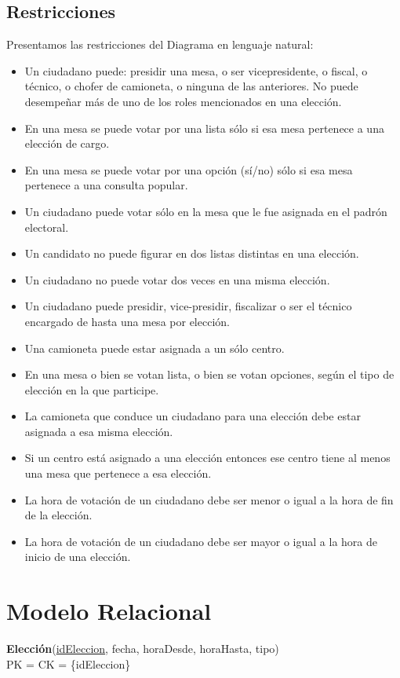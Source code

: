 \documentclass[10pt,a4paper]{article}
\begin{document}
\subsection{Restricciones}
Presentamos las restricciones del Diagrama en lenguaje natural:
\begin{itemize}
\item Un ciudadano puede: presidir una mesa, o ser vicepresidente, o fiscal, o técnico, o chofer de camioneta, o ninguna de las anteriores. No puede desempeñar más de uno de los roles mencionados en una elección.
\item En una mesa se puede votar por una lista sólo si esa mesa pertenece a una elección de cargo.
\item En una mesa se puede votar por una opción (sí/no) sólo si esa mesa pertenece a una consulta popular.
\item Un ciudadano puede votar sólo en la mesa que le fue asignada en el padrón electoral.
\item Un candidato no puede figurar en dos listas distintas en una elección.
\item Un ciudadano no puede votar dos veces en una misma elección.
\item Un ciudadano puede presidir, vice-presidir, fiscalizar o ser el técnico encargado de hasta una mesa por elección.
\item Una camioneta puede estar asignada a un sólo centro.
\item En una mesa o bien se votan lista, o bien se votan opciones, según el tipo de elección en la que participe.
\item La camioneta que conduce un ciudadano para una elección debe estar asignada a esa misma elección.
\item Si un centro está asignado a una elección entonces ese centro tiene al menos una mesa que pertenece a esa elección.
\item La hora de votación de un ciudadano debe ser menor o igual a la hora de fin de la elección.
\item La hora de votación de un ciudadano debe ser mayor o igual a la hora de inicio de una elección.

\end{itemize}
\newpage
\section{Modelo Relacional}

\textbf{Elección}(\underline{idEleccion}, fecha, horaDesde, horaHasta, tipo)\\
PK = CK = \{idEleccion\}\\
\end{document}
